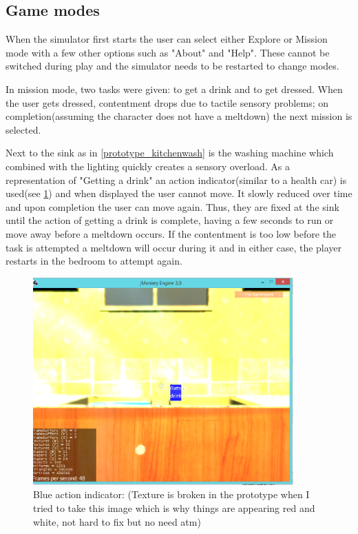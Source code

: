 \documentclass[11pt]{report}
\begin{document}
\subsection*{Game modes}
When the simulator first starts the user can select either Explore or Mission mode with a few other options such as "About" and "Help". These cannot be switched during play and the simulator needs to be restarted to change modes. 

In mission mode, two tasks were given: to get a drink and to get dressed. When the user gets dressed, contentment drops due to tactile sensory problems; on completion(assuming the character does not have a meltdown) the next mission is selected. 

Next to the sink as in \ref{prototype_kitchenwash} is the washing machine which combined with the lighting quickly creates a sensory overload. As a representation of "Getting a drink" an action indicator(similar to a health car) is used(see \ref{prototype_actionindicator}) and when displayed the user cannot move. It slowly reduced over time and upon completion the user can move again. Thus, they are fixed at the sink until the action of getting a drink is complete, having a few seconds to run or move away before a meltdown occurs. If the contentment is too low before the task is attempted a meltdown will occur during it and in either case, the player restarts in the bedroom to attempt again. 

\begin{figure}[H]
\centering
\includegraphics[width=100mm]{images/prototype/actionindicator.png}
\caption{Blue action indicator: (Texture is broken in the prototype when I tried to take this image which is why things are appearing red and white, not hard to fix but no need atm)}
\label{prototype_actionindicator}
\end{figure}
\end{document}
